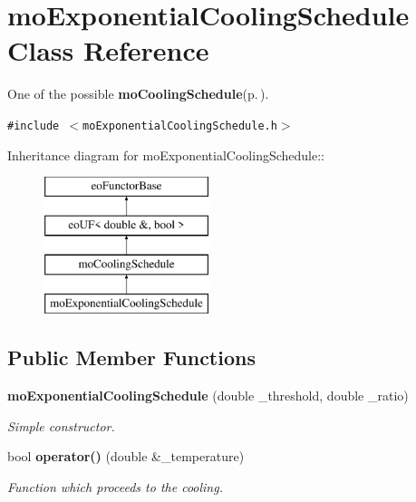 \section{mo\-Exponential\-Cooling\-Schedule Class Reference}
\label{classmo_exponential_cooling_schedule}
One of the possible {\bf mo\-Cooling\-Schedule}{\rm (p.\,\pageref{classmo_cooling_schedule})}.  


{\tt \#include $<$mo\-Exponential\-Cooling\-Schedule.h$>$}

Inheritance diagram for mo\-Exponential\-Cooling\-Schedule::\begin{figure}[H]
\begin{center}
\leavevmode
\includegraphics[height=4cm]{classmo_exponential_cooling_schedule}
\end{center}
\end{figure}
\subsection*{Public Member Functions}
\begin{CompactItemize}
\item 
{\bf mo\-Exponential\-Cooling\-Schedule} (double \_\-threshold, double \_\-ratio)
\begin{CompactList}\small\item\em Simple constructor. \item\end{CompactList}\item 
bool {\bf operator()} (double \&\_\-temperature)
\begin{CompactList}\small\item\em Function which proceeds to the cooling. \item\end{CompactList}\end{CompactItemize}
